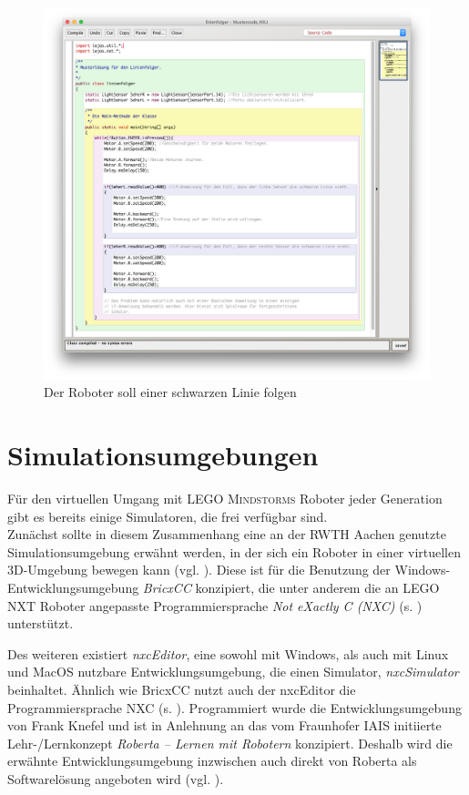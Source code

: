 \documentclass[paper=a4, DIV=calc, BCOR=12mm, twoside=on, onecolumn=on, open = right, titlepage =on, parskip =half-, headsepline = on, footsepline = off, chapterprefix = off, appendixprefix = on, fontsize = 12pt, numbers = noenddot, abstract = on]{scrbook}
\begin{document}
\begin{figure}[htbp]
\centering
\includegraphics[width=\textwidth]{images/linienfolger_bluej.png} 
\caption{Der Roboter soll einer schwarzen Linie folgen}
\label{fig:Bsp BlueJ Linienfolger}
\end{figure} 

\par \singlespacing
\section{Simulationsumgebungen}
\label{sec:simulationsumgebungen}
\onehalfspacing
Für den virtuellen Umgang mit \textsc{LEGO Mindstorms} Roboter jeder Generation gibt es bereits einige Simulatoren, die frei verfügbar sind.\\
Zunächst sollte in diesem Zusammenhang eine an der RWTH Aachen genutzte Simulationsumgebung erwähnt werden, in der sich ein Roboter in einer virtuellen 3D-Umgebung bewegen kann (vgl. \cite{rwth}). Diese ist für die Benutzung der Windows-Entwicklungsumgebung \emph{BricxCC} konzipiert, die unter anderem die an \textsc{LEGO} NXT Roboter angepasste Programmiersprache \emph{Not eXactly C (NXC)} (s. \cite{bricxcc}) unterstützt.

Des weiteren existiert \emph{nxcEditor}, eine sowohl mit Windows, als auch mit Linux und \mbox{MacOS} nutzbare Entwicklungsumgebung, die einen Simulator, \emph{nxcSimulator} beinhaltet. Ähnlich wie BricxCC nutzt auch der nxcEditor die Programmiersprache NXC (s. \cite{nxceditor}). Programmiert wurde die Entwicklungsumgebung von Frank Knefel und ist in Anlehnung an das vom Fraunhofer IAIS initiierte Lehr-/Lernkonzept \emph{Roberta -- Lernen mit Robotern} konzipiert. Deshalb wird die erwähnte Entwicklungsumgebung inzwischen auch direkt von Roberta als Softwarelösung angeboten wird (vgl. \cite{roberta}).
\end{document}
